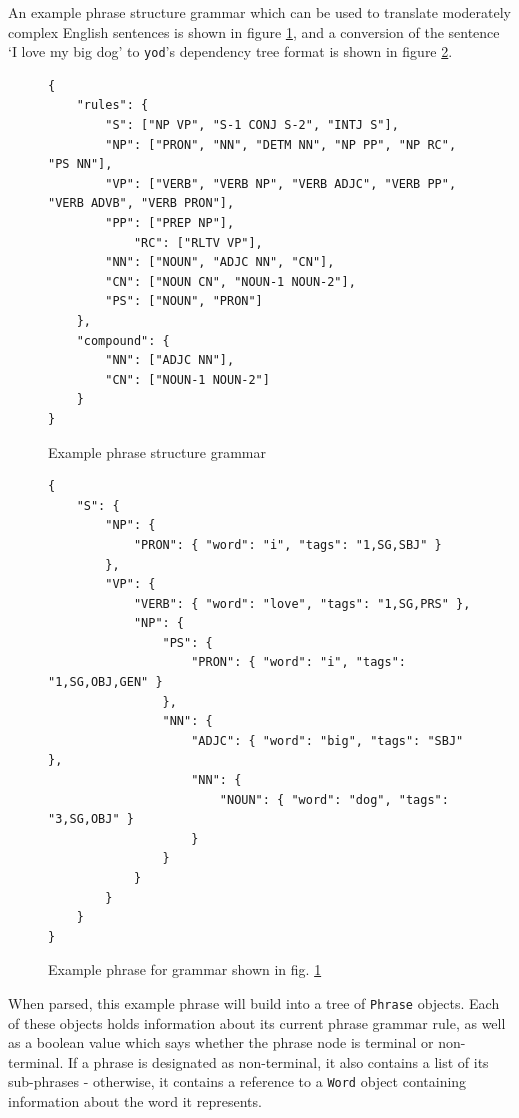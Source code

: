 \documentclass{report}
\begin{document}
	An example phrase structure grammar which can be used to translate moderately complex English sentences is shown in figure \ref{example phrase structure grammar}, and a conversion of the sentence `I love my big dog' to \texttt{yod}'s dependency tree format is shown in figure \ref{example phrase}.
	
	\begin{figure}
		\caption{Example phrase structure grammar}
		\label{example phrase structure grammar}
		\begin{tcolorbox}
			\begin{lstlisting}[breaklines=true,tabsize=2]
{
	"rules": {
		"S": ["NP VP", "S-1 CONJ S-2", "INTJ S"],
		"NP": ["PRON", "NN", "DETM NN", "NP PP", "NP RC", "PS NN"],
		"VP": ["VERB", "VERB NP", "VERB ADJC", "VERB PP", "VERB ADVB", "VERB PRON"],
		"PP": ["PREP NP"],
			"RC": ["RLTV VP"],
		"NN": ["NOUN", "ADJC NN", "CN"],
		"CN": ["NOUN CN", "NOUN-1 NOUN-2"],
		"PS": ["NOUN", "PRON"]
	},
	"compound": {
		"NN": ["ADJC NN"],
		"CN": ["NOUN-1 NOUN-2"]
	}
}
			\end{lstlisting}
		\end{tcolorbox}
	\end{figure}

	\begin{figure}
	\caption{Example phrase for grammar shown in fig. \ref{example phrase structure grammar}}
	\label{example phrase}
	\begin{tcolorbox}
		\begin{lstlisting}[breaklines=true,tabsize=2]
{
	"S": {
		"NP": {
			"PRON": { "word": "i", "tags": "1,SG,SBJ" }
		},
		"VP": {
			"VERB": { "word": "love", "tags": "1,SG,PRS" },
			"NP": {
				"PS": {
					"PRON": { "word": "i", "tags": "1,SG,OBJ,GEN" }
				},
				"NN": {
					"ADJC": { "word": "big", "tags": "SBJ" },
					"NN": {
						"NOUN": { "word": "dog", "tags": "3,SG,OBJ" }
					}
				}
			}
		}
	}
}
		\end{lstlisting}
	\end{tcolorbox}
	\end{figure}

	When parsed, this example phrase will build into a tree of \texttt{Phrase} objects. Each of these objects holds information about its current phrase grammar rule, as well as a boolean value which says whether the phrase node is terminal or non-terminal. If a phrase is designated as non-terminal, it also contains a list of its sub-phrases - otherwise, it contains a reference to a \texttt{Word} object containing information about the word it represents.
	
\end{document}
